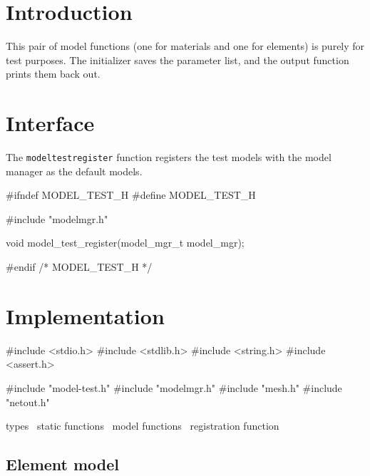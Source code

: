 
\section{Introduction}

This pair of model functions (one for materials and one for elements)
is purely for test purposes.  The initializer saves the parameter
list, and the output function prints them back out.


\section{Interface}

The {\tt{}model{}test{}register} function registers the test models with
the model manager as the default models.

\endmoddef
#ifndef MODEL_TEST_H
#define MODEL_TEST_H

#include "modelmgr.h"

void model_test_register(model_mgr_t model_mgr);

#endif /* MODEL_TEST_H */
\nwendcode{}\nwdocspar


\section{Implementation}

\nwenddocs{}\endmoddef
#include <stdio.h>
#include <stdlib.h>
#include <string.h>
#include <assert.h>

#include "model-test.h"
#include "modelmgr.h"
#include "mesh.h"
#include "netout.h"

\LA{}types~{\nwtagstyle{}}\RA{}
\LA{}static functions~{\nwtagstyle{}}\RA{}
\LA{}model functions~{\nwtagstyle{}}\RA{}
\LA{}registration function~{\nwtagstyle{}}\RA{}
\nwendcode{}\nwdocspar


\subsection{Element model}

